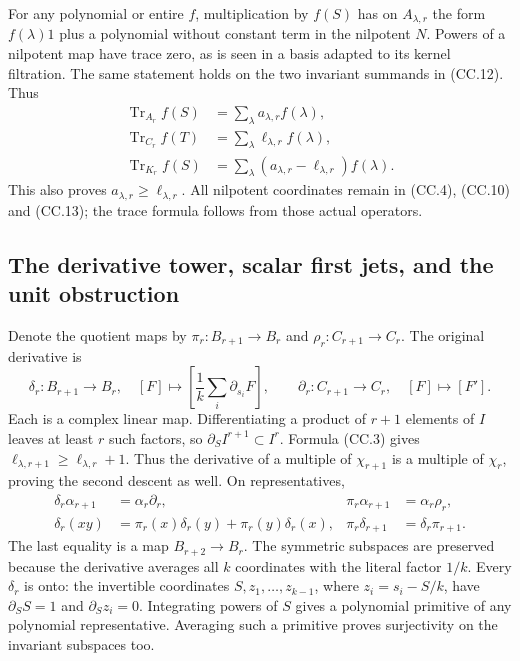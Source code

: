 For any polynomial or entire \(f\), multiplication by \(f(S)\) has
on \(A_{\lambda,r}\) the form \(f(\lambda)1\) plus a polynomial
without constant term in the nilpotent \(N\).  Powers of a nilpotent
map have trace zero, as is seen in a basis adapted to its kernel
filtration.  The same statement holds on the two invariant summands
in (CC.12).  Thus
\[
\begin{aligned}
 \operatorname{Tr}_{A_r}f(S)&=\sum_\lambda a_{\lambda,r}f(\lambda),\\
 \operatorname{Tr}_{C_r}f(T)&=\sum_\lambda\ell_{\lambda,r}f(\lambda),\\
 \operatorname{Tr}_{K_r}f(S)&=
       \sum_\lambda(a_{\lambda,r}-\ell_{\lambda,r})f(\lambda).
\end{aligned}
\tag{CC.15}
\]
This also proves \(a_{\lambda,r}\geq\ell_{\lambda,r}\).
All nilpotent coordinates remain in (CC.4), (CC.10) and (CC.13);
the trace formula follows from those actual operators.

\subsection{The derivative tower, scalar first jets, and the unit obstruction}

Denote the quotient maps by
\(\pi_r:B_{r+1}\to B_r\) and \(\rho_r:C_{r+1}\to C_r\).
The original derivative is
\[
 \delta_r:B_{r+1}\longrightarrow B_r,\quad
 [F]\longmapsto\left[\frac1k\sum_i\partial_{s_i}F\right],
 \qquad
 \partial_r:C_{r+1}\longrightarrow C_r,\quad [F]\longmapsto[F'].
 \tag{CC.16}
\]
Each is a complex linear map.  Differentiating a product of \(r+1\)
elements of \(I\) leaves at least \(r\) such factors, so
\(\partial_S I^{r+1}\subset I^r\).
Formula (CC.3) gives
\(\ell_{\lambda,r+1}\geq\ell_{\lambda,r}+1\).
Thus the derivative of a multiple of \(\chi_{r+1}\) is a multiple
of \(\chi_r\), proving the second descent as well.  On representatives,
\[
\begin{aligned}
 \delta_r\alpha_{r+1}&=\alpha_r\partial_r,&
 \pi_r\alpha_{r+1}&=\alpha_r\rho_r,\\
 \delta_r(xy)&=\pi_r(x)\delta_r(y)+\pi_r(y)\delta_r(x),&
 \pi_r\delta_{r+1}&=\delta_r\pi_{r+1}.
\end{aligned}
\tag{CC.17}
\]
The last equality is a map \(B_{r+2}\to B_r\).
The symmetric subspaces are preserved because the derivative averages
all \(k\) coordinates with the literal factor \(1/k\).
Every \(\delta_r\) is onto: the invertible coordinates
\(S,z_1,\ldots,z_{k-1}\), where \(z_i=s_i-S/k\), have
\(\partial_S S=1\) and \(\partial_Sz_i=0\).  Integrating powers
of \(S\) gives a polynomial primitive of any polynomial representative.
Averaging such a primitive proves surjectivity on the invariant
subspaces too.

